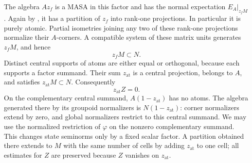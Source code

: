 The algebra $Az_f$ is a MASA in this factor and has the normal
expectation $E_A|_{z_fM}$.  Again by \cite[Theorem~4.1]{AS12}, it has a
partition of $z_f$ into rank-one projections.  In particular it is
purely atomic.  Partial isometries joining any two of these rank-one
projections normalize their $A$-corners.  A compatible system of these
matrix units generates $z_fM$, and hence
\[
 z_fM\subset N.
\]
Distinct central supports of atoms are either equal or orthogonal,
because each supports a factor summand.  Their sum $z_{\mathrm{at}}$ is
a central projection, belongs to $A$, and satisfies
$z_{\mathrm{at}}M\subset N$.  Consequently
\[
 z_{\mathrm{at}}Z=0.
\]
On the complementary central summand, $A(1-z_{\mathrm{at}})$ has no
atoms.  The algebra generated there by its groupoid normalizers is
$N(1-z_{\mathrm{at}})$: corner normalizers extend by zero, and global
normalizers restrict to this central summand.  We may use the normalized
restriction of $\varphi$ on the nonzero complementary summand.  This
changes state seminorms only by a fixed scalar factor.
A partition obtained there extends to $M$ with the same number of cells
by adding $z_{\mathrm{at}}$ to one cell; all estimates for $Z$ are
preserved because $Z$ vanishes on $z_{\mathrm{at}}$.
